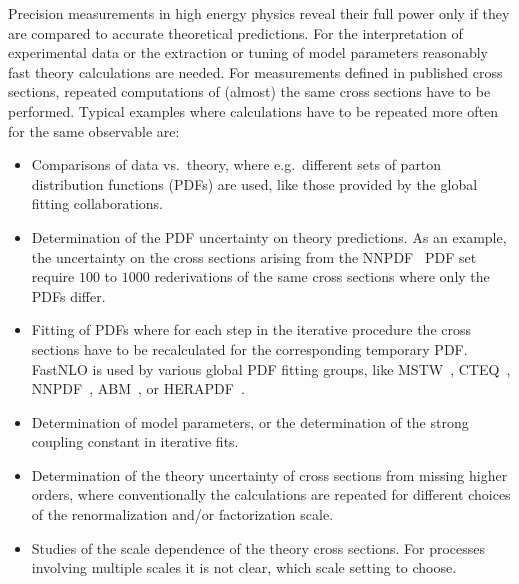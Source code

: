 \documentclass{DISproc}
\begin{document}
Precision measurements in high energy physics reveal their full power
only if they are compared to accurate theoretical predictions.
For the interpretation of experimental data or the extraction or tuning of
model parameters reasonably fast theory calculations are needed.  For
measurements defined in published cross sections, repeated
computations of (almost) the same cross sections have to be performed.
Typical examples where calculations have to be repeated more often for
the same observable are:
\begin{itemize}
\item Comparisons of data vs.\ theory, where e.g.\
  different sets of parton distribution functions (PDFs) are used,
  like those provided by the global fitting collaborations.
\item Determination of the PDF uncertainty on theory predictions.  As
  an example, the uncertainty on the cross sections arising from the
  NNPDF~\cite{Ball:2011mu} PDF set require $100$ to $1000$
  rederivations of the same cross sections where only the PDFs
  differ.
\item Fitting of PDFs where for each step in the iterative procedure
  the cross sections have to be recalculated for the corresponding
  temporary PDF\@.  FastNLO is used by various global PDF fitting
  groups, like MSTW~\cite{Martin:2009iq}, CTEQ~\cite{Lai:2010vv},
  NNPDF~\cite{Ball:2011mu}, ABM~\cite{Alekhin:2012ig}, or
  HERAPDF~\cite{Nowak:12}.
\item Determination of model parameters, or the determination of the
  strong coupling constant in iterative fits.
\item Determination of the theory uncertainty of cross sections from
  missing higher orders, where conventionally the calculations are
  repeated for different choices of the renormalization and/or
  factorization scale.
\item Studies of the scale dependence of the theory cross sections.
  For processes involving multiple scales it is not clear, which scale
  setting to choose.
\end{itemize}
\end{document}
